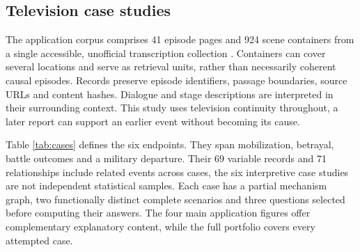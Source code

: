 \documentclass{svproc}
\begin{document}
\subsection{Television case studies}
The application corpus comprises 41 episode pages and 924 scene containers from a single accessible, unofficial transcription collection \cite{screenscripts}. Containers can cover several locations and serve as retrieval units, rather than necessarily coherent causal episodes. Records preserve episode identifiers, passage boundaries, source URLs and content hashes. Dialogue and stage descriptions are interpreted in their surrounding context. This study uses television continuity throughout, a later report can support an earlier event without becoming its cause.

Table \ref{tab:cases} defines the six endpoints. They span mobilization, betrayal, battle outcomes and a military departure. Their 69 variable records and 71 relationships include related events across cases, the six interpretive case studies are not independent statistical samples. Each case has a partial mechanism graph, two functionally distinct complete scenarios and three questions selected before computing their answers. The four main application figures offer complementary explanatory content, while the full portfolio covers every attempted case.
\end{document}
